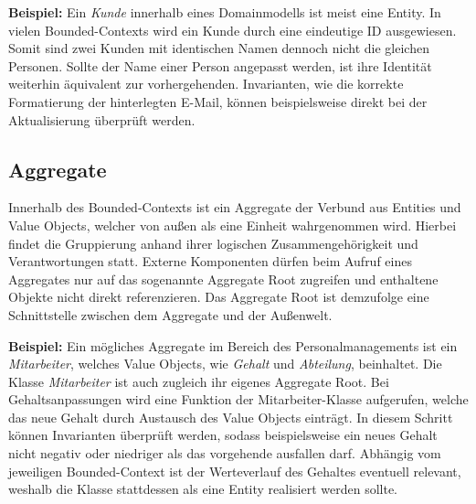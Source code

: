 \textbf{Beispiel:} Ein \emph{Kunde} innerhalb eines Domainmodells ist meist eine Entity. In vielen Bounded-Contexts wird ein Kunde durch eine eindeutige ID ausgewiesen. Somit sind zwei Kunden mit identischen Namen dennoch nicht die gleichen Personen. Sollte der Name einer Person angepasst werden, ist ihre Identität weiterhin äquivalent zur vorhergehenden. Invarianten, wie die korrekte Formatierung der hinterlegten E-Mail, können beispielsweise direkt bei der Aktualisierung überprüft werden.


\subsection{Aggregate}

Innerhalb des Bounded-Contexts ist ein Aggregate der Verbund aus Entities und Value Objects, welcher von außen als eine Einheit wahrgenommen wird. Hierbei findet die Gruppierung anhand ihrer logischen Zusammengehörigkeit und Verantwortungen statt. Externe Komponenten dürfen beim Aufruf eines Aggregates nur auf das sogenannte Aggregate Root zugreifen und enthaltene Objekte nicht direkt referenzieren. Das Aggregate Root ist demzufolge eine Schnittstelle zwischen dem Aggregate und der Außenwelt. \cite[S. 126f.]{Evans.2011}

\textbf{Beispiel:} Ein mögliches Aggregate im Bereich des Personalmanagements ist ein \emph{Mitarbeiter}, welches Value Objects, wie \emph{Gehalt} und \emph{Abteilung}, beinhaltet. Die Klasse \emph{Mitarbeiter} ist auch zugleich ihr eigenes Aggregate Root. Bei Gehaltsanpassungen wird eine Funktion der Mitarbeiter-Klasse aufgerufen, welche das neue Gehalt durch Austausch des Value Objects einträgt. In diesem Schritt können Invarianten überprüft werden, sodass beispielsweise ein neues Gehalt nicht negativ oder niedriger als das vorgehende ausfallen darf. Abhängig vom jeweiligen Bounded-Context ist der Werteverlauf des Gehaltes eventuell relevant, weshalb die Klasse stattdessen als eine Entity realisiert werden sollte. 

